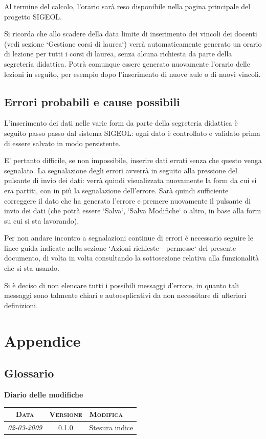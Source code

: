 \documentclass[11pt,a4paper]{article}
\newcommand{\modifiche} 
{
\newpage
\begin{center}
\textbf{Diario delle modifiche} \\
\bigskip
\begin{tabular}{|c|c|p{0.62\textwidth}|}
\hline
\textsc{Data} & \textsc{Versione} & \textsc{Modifica} \\
\hline
\hline
\textit{02-03-2009} & 0.1.0 & Stesura indice\\
\hline
\end{tabular}
\end{center}
}
\begin{document}
Al termine del calcolo, l'orario sarà reso disponibile nella pagina principale del progetto SIGEOL.

Si ricorda che allo scadere della data limite di inserimento dei vincoli dei docenti (vedi sezione `Gestione corsi di laurea`) verrà automaticamente generato un orario di lezione per tutti i corsi di laurea, senza alcuna richiesta da parte della segreteria didattica. Potrà comunque essere generato nuovamente l'orario delle lezioni in seguito, per esempio dopo l'inserimento di nuove aule o di nuovi vincoli.
\subsection{Errori probabili e cause possibili}
L'inserimento dei dati nelle varie form da parte della segreteria didattica è seguito passo passo dal sistema SIGEOL: ogni dato è controllato e validato prima di essere salvato in modo persistente.

E' pertanto difficile, se non impossibile, inserire dati errati senza che questo venga segnalato.
La segnalazione degli errori avverrà in seguito alla pressione del pulsante di invio dei dati: verrà quindi visualizzata nuovamente la form da cui si era partiti, con in più la segnalazione dell'errore. Sarà quindi sufficiente correggere il dato che ha generato l'errore e premere nuovamente il pulsante di invio dei dati (che potrà essere `Salva`, `Salva Modifiche` o altro, in base alla form su cui si sta lavorando).

Per non andare incontro a segnalazioni continue di errori è necessario seguire le linee guida indicate nella sezione `Azioni richieste - permesse` del presente documento, di volta in volta consultando la sottosezione relativa alla funzionalità che si sta usando.

Si è deciso di non elencare tutti i possibili messaggi d'errore, in quanto tali messaggi sono talmente chiari e autoesplicativi da non necessitare di ulteriori definizioni.
\newpage
\section{Appendice}
\subsection{Glossario}




\modifiche
\end{document}

